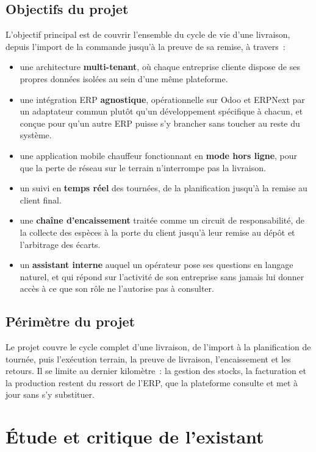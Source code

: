 \subsection{Objectifs du projet}

L'objectif principal est de couvrir l'ensemble du cycle de vie d'une livraison, depuis l'import de
la commande jusqu'à la preuve de sa remise, à travers~:

\begin{itemize}
  \item une architecture \textbf{multi-tenant}, où chaque entreprise cliente dispose de ses propres
  données isolées au sein d'une même plateforme.
  \item une intégration ERP \textbf{agnostique}, opérationnelle sur Odoo et ERPNext par un
  adaptateur commun plutôt qu'un développement spécifique à chacun, et conçue pour qu'un autre ERP
  puisse s'y brancher sans toucher au reste du système.
  \item une application mobile chauffeur fonctionnant en \textbf{mode hors ligne}, pour que la
  perte de réseau sur le terrain n'interrompe pas la livraison.
  \item un suivi en \textbf{temps réel} des tournées, de la planification jusqu'à la remise au
  client final.
  \item une \textbf{chaîne d'encaissement} traitée comme un circuit de responsabilité, de la
  collecte des espèces à la porte du client jusqu'à leur remise au dépôt et l'arbitrage des
  écarts.
  \item un \textbf{assistant interne} auquel un opérateur pose ses questions en langage naturel,
  et qui répond sur l'activité de son entreprise sans jamais lui donner accès à ce que son rôle
  ne l'autorise pas à consulter.
\end{itemize}

\subsection{Périmètre du projet}

Le projet couvre le cycle complet d'une livraison, de l'import à la planification de tournée, puis
l'exécution terrain, la preuve de livraison, l'encaissement et les retours. Il se limite au dernier
kilomètre~: la gestion des stocks, la facturation et la production
restent du ressort de l'ERP, que la plateforme consulte et met à jour sans s'y substituer.

\section{Étude et critique de l'existant}


